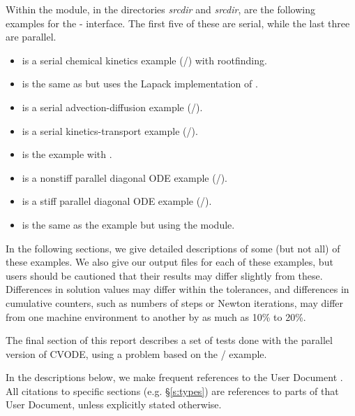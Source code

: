 \vspace{0.2in}\noindent
Within the {\fcvode} module, in the directories 
{\em srcdir} and
{\em srcdir}, are the following examples for
the {\F}-{\C} interface.  The first five of these are serial, while
the last three are parallel.
\begin{itemize}
\item {} is a serial chemical kinetics example (/{\cvdense})
  with rootfinding.
\item {} is the same as  but uses the Lapack
  implementation of {\cvdense}.
\item {} is a serial advection-diffusion example (/{\cvband}).
\item {} is a serial kinetics-transport example (/{\cvspgmr}).
\item {} is the  example with {\fcvbp}.
\item {} is a nonstiff parallel diagonal ODE example
  (/).
\item {} is a stiff parallel diagonal ODE example (/{\cvspgmr}).
\item {} is the same as the  example
       but using the {\fcvbbd} module.
\end{itemize}

\vspace{0.2in}\noindent
In the following sections, we give detailed descriptions of some (but
not all) of these examples.  We also give our output files for
each of these examples, but users should be cautioned that their
results may differ slightly from these.  Differences in solution
values may differ within the tolerances, and differences in cumulative
counters, such as numbers of steps or Newton iterations, may differ
from one machine environment to another by as much as 10\% to 20\%.

The final section of this report describes a set of tests done with the
parallel version of CVODE, using a problem based on the
/ example.

In the descriptions below, we make frequent references to the {\cvode}
User Document \cite{cvode_ug}.  All citations to specific sections
(e.g. \S\ref{s:types}) are references to parts of that User Document, unless
explicitly stated otherwise.

